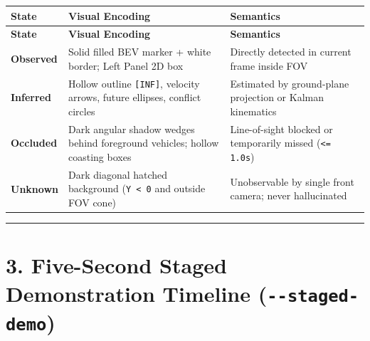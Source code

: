 \documentclass[10.5pt,a4paper]{article}
\begin{document}
\begin{footnotesize}
\setlength{\tabcolsep}{4pt}
\setlength{\LTleft}{0pt}\setlength{\LTright}{0pt}
\begin{longtable}{>{\raggedright\arraybackslash}p{} >{\raggedright\arraybackslash}p{} >{\raggedright\arraybackslash}p{}}
\toprule
\textbf{State} & \textbf{Visual Encoding} & \textbf{Semantics} \\
\midrule
\endfirsthead
\toprule
\textbf{State} & \textbf{Visual Encoding} & \textbf{Semantics} \\
\midrule
\endhead
\bottomrule
\endfoot
\textbf{Observed} & Solid filled BEV marker + white border; Left Panel 2D box & Directly detected in current frame inside FOV \\
\textbf{Inferred} & Hollow outline \texttt{[INF]}, velocity arrows, future ellipses, conflict circles & Estimated by ground-plane projection or Kalman kinematics \\
\textbf{Occluded} & Dark angular shadow wedges behind foreground vehicles; hollow coasting boxes & Line-of-sight blocked or temporarily missed (\texttt{<= 1.\allowbreak{}0s}) \\
\textbf{Unknown} & Dark diagonal hatched background (\texttt{Y < 0} and outside FOV cone) & Unobservable by single front camera; never hallucinated \\
\end{longtable}
\end{footnotesize}


\par\noindent\rule{\textwidth}{0.4pt}\par\medskip

\section{3. Five-Second Staged Demonstration Timeline (\texttt{-\allowbreak{}-\allowbreak{}staged-\allowbreak{}demo})}
\end{document}
